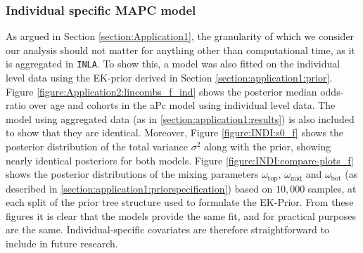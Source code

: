 \subsubsection{Individual specific MAPC model}
\label{appendix:individual}
As argued in Section \ref{section:Application1}, the granularity of which we consider our analysis should not matter for anything other than computational time, as it is aggregated in \texttt{INLA}. To show this, a model was also fitted on the individual level data using the EK-prior derived in Section \ref{section:application1:prior}. Figure \ref{figure:Application2:lincombs_f_ind} shows the posterior median odds-ratio over age and cohorts in the aPc model using individual level data. The model using aggregated data (as in \ref{section:application1:results}) is also included to show that they are identical. Moreover, Figure \ref{figure:INDI:s0_f} shows the posterior distribution of the total variance $\sigma^2$ along with the prior, showing nearly identical posteriors for both models. Figure \ref{figure:INDI:compare-plots_f} shows the posterior distributions of the mixing parameters $\omega_{\text{top}}$, $\omega_{\text{mid}}$ and $\omega_{\text{bot}}$ (as described in \ref{section:application1:priorspecification}) based on $10,000$ samples, at each split of the prior tree structure used to formulate the EK-Prior. From these figures it is clear that the models provide the same fit, and for practical purposes are the same. Individual-specific covariates are therefore straightforward to include in future research.


